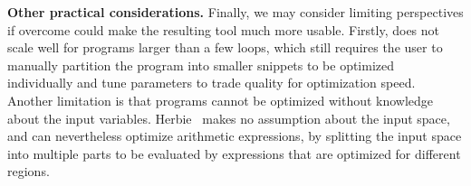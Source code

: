 \textbf{Other practical considerations.}  Finally, we may consider limiting
perspectives if overcome could make the resulting tool much more usable.
Firstly, \soap{} does not scale well for programs larger than a few loops,
which still requires the user to manually partition the program into smaller
snippets to be optimized individually and tune parameters to trade quality for
optimization speed.  Another limitation is that programs cannot be optimized
without knowledge about the input variables.  Herbie~\cite{panchekha15} makes
no assumption about the input space, and can nevertheless optimize arithmetic
expressions, by splitting the input space into multiple parts to be evaluated
by expressions that are optimized for different regions.







